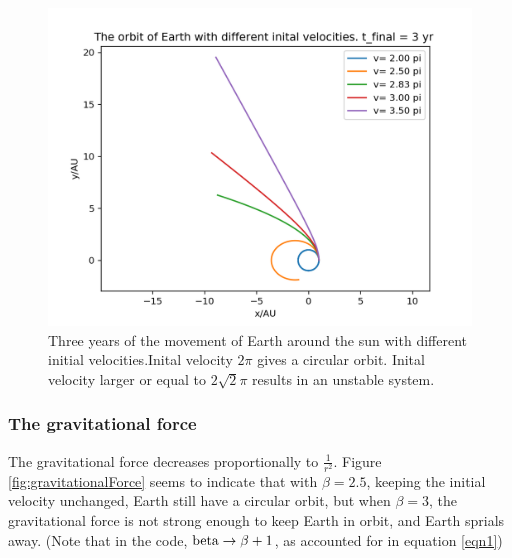 \documentclass{article}
\begin{document}
\begin{figure}
  \includegraphics[width=\linewidth]{threeyear.png}
  \caption{Three years of the movement of Earth around the sun with different initial velocities.Inital velocity $2\pi$ gives a circular orbit. Inital velocity larger or equal to $2 \sqrt{2}\pi$ results in an unstable system.}
  \label{fig:threeyear}
\end{figure}

\subsubsection{The gravitational force}
The gravitational force decreases proportionally to  $ \frac{1}{r^2}$.  Figure \ref{fig:gravitationalForce} seems to indicate that with $\beta =2.5$, keeping the initial velocity unchanged, Earth still have a circular orbit, but when $\beta =3$, the gravitational force is not strong enough to keep Earth in orbit, and Earth sprials away. (Note that in the code, $\textnormal{beta} \to \beta+1$, as accounted for in equation \ref{eqn1})
\end{document}

